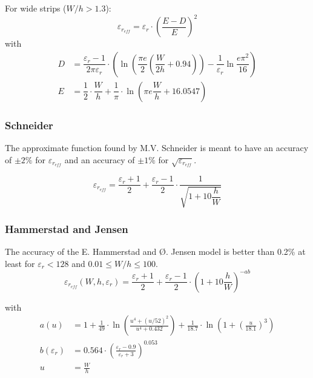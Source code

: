 \documentclass[10pt]{report}
\begin{document}
For wide strips ($W/h > 1.3$):
\begin{equation}
\varepsilon_{r_{eff}} = \varepsilon_r\cdot\left(\dfrac{E - D}{E}\right)^2
\end{equation}
with
\begin{align}
D &= \dfrac{\varepsilon_r - 1}{2\pi \varepsilon_r}\cdot\left(\ln{\left(\dfrac{\pi e}{2}\left(\dfrac{W}{2h} + 0.94\right)\right)} - \dfrac{1}{\varepsilon_r} \ln{\dfrac{e\pi^{2}}{16}}\right)\\
E &= \dfrac{1}{2}\cdot\dfrac{W}{h} + \dfrac{1}{\pi}\cdot \ln{\left(\pi e \dfrac{W}{h} + 16.0547\right)}
\end{align}

\subsubsection{Schneider}

The approximate function found by M.V. Schneider \cite{Schneider} is
meant to have an accuracy of $\pm 2\%$ for $\varepsilon_{r_{eff}}$ and
an accuracy of $\pm 1\%$ for $\sqrt{\varepsilon_{r_{eff}}}$.

\begin{equation}
\varepsilon_{r_{eff}} = \dfrac{\varepsilon_{r} + 1}{2} + \dfrac{\varepsilon_{r} - 1}{2}\cdot\dfrac{1}{\sqrt{1 + 10\dfrac{h}{W}}}
\end{equation}

\subsubsection{Hammerstad and Jensen}

The accuracy of the E. Hammerstad and {\O}. Jensen \cite{Hammerstad} model
is better than 0.2\% at least for $\varepsilon_r < 128$ and $0.01 \le
W/h \le 100$.
\begin{equation}
\label{eq:HandJErEff}
\varepsilon_{r_{eff}}\left(W, h, \varepsilon_r\right) = \frac{\varepsilon_{r} + 1}{2} + \frac{\varepsilon_{r} - 1}{2}\cdot\left(1 + 10\frac{h}{W}\right)^{-ab}
\end{equation}

with
\begin{align}
\label{eq:HandJa}
a\left(u\right) &= 1 + \frac{1}{49}\cdot\ln{\left(\frac{u^{4} + \left(u/52\right)^{2}}{u^{4} + 0.432}\right)} + \frac{1}{18.7}\cdot\ln{\left(1 + \left(\frac{u}{18.1}\right)^{3}\right)}\\
\label{eq:HandJb}
b\left(\varepsilon_r\right) &= 0.564\cdot\left(\frac{\varepsilon_{r} - 0.9}{\varepsilon_{r} + 3}\right)^{0.053}\\
u &= \frac{W}{h}
\end{align}
\end{document}
